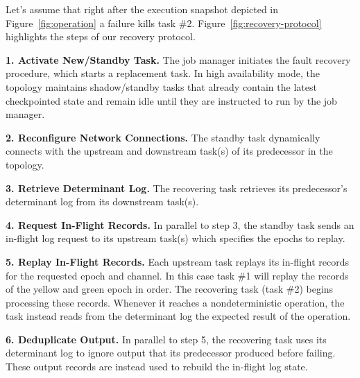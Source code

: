 \documentclass[sigconf]{acmart}
\newcommand{\para}[1]{\vspace{1mm}\noindent\textbf{#1.}}
\begin{document}
Let's assume that right after the execution snapshot depicted in Figure~\ref{fig:operation} a failure kills task \#2.
Figure~\ref{fig:recovery-protocol} highlights the steps of our recovery protocol.%


\para{1. Activate New/Standby Task}
The job manager initiates the fault recovery procedure, which starts a replacement task. In high availability mode, the topology maintains shadow/standby tasks that already contain the latest checkpointed state and remain idle until they are instructed to run by the job manager.

\para{2. Reconfigure Network Connections}
The standby task dynamically connects with the upstream and downstream task(s) of its predecessor in the topology.

\para{3. Retrieve Determinant Log}
The recovering task retrieves its predecessor's determinant log from its downstream task(s).

\para{4. Request In-Flight Records}
In parallel to step 3, the standby task sends an in-flight log request to its upstream task(s) which specifies the epochs to replay. 


\para{5. Replay In-Flight Records}
Each upstream task replays its in-flight records for the requested epoch and channel. In this case task \#1 will replay the records of the yellow and green epoch in order.
The recovering task (task \#2) begins processing these records. Whenever it reaches a nondeterministic operation, the task instead reads from the determinant log the expected result of the operation.

\para{6. Deduplicate Output}
In parallel to step 5, the recovering task uses its determinant log to ignore output that its predecessor produced before failing.
These output records are instead used to rebuild the in-flight log state.
\end{document}
